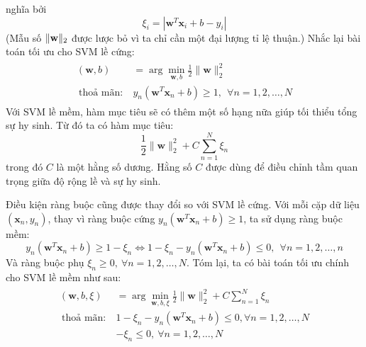 nghĩa bởi
\begin{equation}
\xi_i = |\mathbf{w}^T\mathbf{x}_i + b - y_i|
\end{equation}
(Mẫu số $\|\mathbf{w}\|_2$ được lược bỏ vì ta chỉ cần một đại lượng tỉ lệ thuận.)
Nhắc lại bài toán tối ưu cho SVM lề cứng:
\begin{eqnarray}
\label{eqn:20_1}
\begin{aligned}
(\mathbf{w}, b) &= \arg \min_{\mathbf{w}, b} \frac{1}{2}{\|\mathbf{w}\|_2^2}   \\\
\text{thoả mãn:}~ & y_n(\mathbf{w}^T\mathbf{x}_n + b) \geq 1, ~~\forall n = 1, 2, \dots, N
\end{aligned}
\end{eqnarray}
Với SVM lề mềm, hàm mục tiêu sẽ có thêm một số hạng nữa giúp tối
thiểu {tổng sự hy sinh}. Từ đó ta có hàm mục tiêu:
\begin{equation}
\frac{1}{2}{\|\mathbf{w}\|_2^2} + C \sum_{n=1}^N \xi_n
\end{equation}
trong đó $C$ là một hằng số dương. Hằng số $C$ được dùng để điều chỉnh tầm quan trọng giữa độ rộng lề và
sự hy sinh.

Điều kiện ràng buộc cũng được thay đổi so với SVM lề cứng. Với mỗi cặp dữ liệu $(\mathbf{x}_n,
y_n)$, thay vì ràng buộc {cứng} $y_n(\mathbf{w}^T\mathbf{x}_n + b) \geq
1$, ta sử dụng ràng buộc {mềm}:
\begin{equation*}
y_n(\mathbf{w}^T\mathbf{x}_n + b) \geq 1 - \xi_n \Leftrightarrow 1 - \xi_n - y_n(\mathbf{w}^T\mathbf{x}_n + b) \leq 0, ~~ \forall n = 1, 2, \dots, n
\end{equation*}
Và ràng buộc phụ $\xi_n \geq 0, ~\forall n = 1, 2, \dots, N$.
Tóm lại, ta có bài toán tối ưu chính cho SVM lề mềm
như sau:
\begin{eqnarray}
\label{eqn:20_2}
\begin{aligned}
(\mathbf{w}, b, \xi) &= \arg \min_{\mathbf{w}, b, \xi} \frac{1}{2}{\|\mathbf{w}\|_2^2} + C \sum_{n=1}^N \xi_n  \\\
\text{thoả mãn:}~ & 1 - \xi_n - y_n(\mathbf{w}^T\mathbf{x}_n + b) \leq 0, \forall n = 1, 2, \dots, N  \\\
& -\xi_n \leq 0,  ~\forall n = 1, 2, \dots, N
\end{aligned}
\end{eqnarray}


